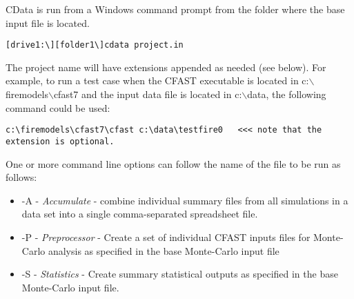 CData is run from a Windows command prompt from the folder where the base input file is located.

\begin{lstlisting}
[drive1:\][folder1\]cdata project.in
\end{lstlisting}

The project name will have extensions appended as needed (see below). For example, to run a test case when the CFAST executable is located in c:$\backslash$firemodels$\backslash$cfast7 and the input data file is located in c:$\backslash$data, the following command could be used:

\begin{lstlisting}
c:\firemodels\cfast7\cfast c:\data\testfire0   <<< note that the extension is optional.
\end{lstlisting}

One or more command line options can follow the name of the file to be run as follows:

\begin{itemize}
\item -A - {\it Accumulate} - combine individual summary files from all simulations in a data set into a single comma-separated spreadsheet file.
\item -P - {\it Preprocessor} - Create a set of individual CFAST inputs files for Monte-Carlo analysis as specified in the base Monte-Carlo input file
\item -S - {\it Statistics} - Create summary statistical outputs as specified in the base Monte-Carlo input file.
\end{itemize}


\label{last_page}





